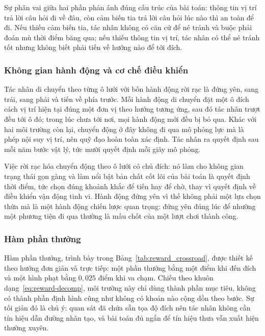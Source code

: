 \indent Sự phân vai giữa hai phần phản ánh đúng cấu trúc của bài toán: thông tin vị trí
trả lời câu hỏi đi về đâu, còn cảm biến tia trả lời câu hỏi lúc nào thì an toàn để đi.
Nếu thiếu cảm biến tia, tác nhân không có căn cứ để né tránh và buộc phải đoán mù thời
điểm băng qua; nếu thiếu thông tin vị trí, tác nhân có thể né tránh tốt nhưng không
biết phải tiến về hướng nào để tới đích.

\subsubsection{Không gian hành động và cơ chế điều khiển}
\indent Tác nhân di chuyển theo từng ô lưới với bốn hành động rời rạc là đứng yên, sang
trái, sang phải và tiến về phía trước. Mỗi hành động di chuyển đặt một ô đích cách vị
trí hiện tại đúng một đơn vị theo hướng tương ứng, sau đó tác nhân trượt đều tới ô đó;
trong lúc chưa tới nơi, mọi hành động mới đều bị bỏ qua. Khác với hai môi trường còn
lại, chuyển động ở đây không đi qua mô phỏng lực mà là phép nội suy vị trí, nên quỹ đạo
hoàn toàn xác định. Tác nhân ra quyết định sau mỗi năm bước vật lý, tức mười quyết định
mỗi giây mô phỏng.

\indent Việc rời rạc hóa chuyển động theo ô lưới có chủ đích: nó làm cho không gian
trạng thái gọn gàng và làm nổi bật bản chất cốt lõi của bài toán là quyết định
thời điểm, tức chọn đúng khoảnh khắc để tiến hay để chờ, thay vì quyết định về
điều khiển vận động tinh vi. Hành động đứng yên vì thế không phải một lựa chọn thừa mà
là một hành động chiến lược quan trọng: đứng yên đúng lúc để nhường một phương tiện đi
qua thường là mấu chốt của một lượt chơi thành công.

\subsubsection{Hàm phần thưởng}
\indent Hàm phần thưởng, trình bày trong Bảng~\ref{tab:reward_crossroad}, được thiết kế
theo hướng đơn giản và trực tiếp: một phần thưởng bằng một điểm khi đến đích và một hình
phạt bằng $0{,}025$ điểm khi va chạm. Chiếu theo khuôn dạng~\eqref{eq:reward-decomp},
môi trường này chỉ dùng thành phần mục tiêu, không có thành phần định hình cũng như
không có khoản nào cộng dồn theo bước. Sự tối giản đó là chủ ý: quan sát đã chứa sẵn tọa
độ đích nên tác nhân không cần tín hiệu dẫn đường nhân tạo, và bài toán đủ ngắn để tín
hiệu thưa vẫn xuất hiện thường xuyên.

